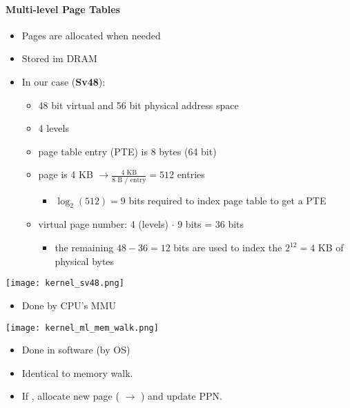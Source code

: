 \paragraph{Multi-level Page Tables}
\begin{itemize}
    \item Pages are allocated when needed
    \item Stored im DRAM
    \item In our case (\textbf{Sv48}):
          \begin{itemize}
              \item 48 bit virtual and 56 bit physical address space
              \item 4 levels
              \item page table entry (PTE) is 8 bytes (64 bit)
              \item page is 4 KB $\to \frac{\text{4 KB}}{\text{8 B / entry}} = 512$ entries
                    \begin{itemize}
                        \item $\log_{2}(512) = 9$ bits required to index page table to get a PTE
                    \end{itemize}
              \item virtual page number: 4 (levels) $\cdot$ 9 bits = 36 bits
                    \begin{itemize}
                        \item the remaining $48-36=12$ bits are used to index the ${2}^{12} = 4$ KB of physical bytes
                    \end{itemize}
          \end{itemize}
\end{itemize}

\begin{center}
    \texttt{[image: kernel\_sv48.png]}
\end{center}

\begin{itemize}
    \item Done by CPU's MMU
\end{itemize}
\begin{center}
    \texttt{[image: kernel\_ml\_mem\_walk.png]}
\end{center}

\newpar{}
\begin{itemize}
    \item Done in software (by OS)
    \item Identical to memory walk.
    \item If , allocate new page ( $\to$ ) and update PPN.\ %
\end{itemize}


